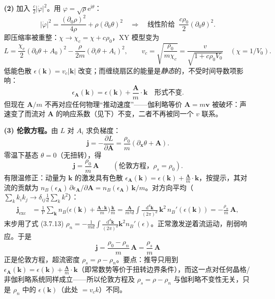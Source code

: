 \textbf{(2)} 加入 $\frac{c}{2}|\dot\varphi|^{2}$。用 $\varphi=\sqrt{\rho}\mathrm{e}^{\mathrm{i}\theta}$：
\begin{equation*}
|\dot\varphi|^{2}=\frac{(\partial_0\rho)^{2}}{4\rho}+\rho(\partial_0\theta)^{2}
\quad\Longrightarrow\quad
\text{线性阶给 }\ \frac{c\rho_0}{2}(\partial_0\theta)^{2} .
\end{equation*}
即压缩率被重整：$\chi\to\chi_c=\chi+c\rho_0$，XY 模型变为
\begin{equation*}
L=\frac{\chi_c}{2}(\partial_0\theta+A_0)^{2}-\frac{\rho}{2m}(\partial_i\theta+A_i)^{2},
\qquad
v_c=\sqrt{\frac{\rho_0}{m\chi_c}}=\frac{v}{\sqrt{1+c\rho_0V_0}}\quad(\chi=1/V_0) .
\end{equation*}
低能色散 $\epsilon(\pmb{k})=v_c|\pmb{k}|$ 改变；而缠绕扇区的能量是\emph{静态}的，不受时间导数项影响：
\begin{equation*}
\epsilon_{\pmb{A}}(\pmb{k})=\epsilon(\pmb{k})+\frac{\pmb{A}}{m}\cdot\pmb{k}
\quad\text{形式不变} .
\end{equation*}
但现在 $\pmb{A}/m$ 不再对应任何物理“推动速度”——伽利略等价 $\pmb{A}=m\pmb{v}$ 被破坏：声速变了而流对 $\pmb{A}$ 的响应系数（见下）不变，二者不再被同一个 $v$ 联系。

\textbf{(3) 伦敦方程。}由 $L$ 对 $A_i$ 求负梯度：
\begin{equation*}
\pmb{j}=-\frac{\partial L}{\partial\pmb{A}}=\frac{\rho_0}{m}(\partial_{\pmb{x}}\theta+\pmb{A}) .
\end{equation*}
零温下基态 $\theta=0$（无扭转），得
\begin{equation*}
\pmb{j}=\frac{\rho_0}{m}\,\pmb{A}
\qquad(\text{伦敦方程，}\rho_s=\rho_0).
\end{equation*}
有限温修正：动量为 $\pmb{k}$ 的激发具有色散 $\epsilon_{\pmb{A}}(\pmb{k})=\epsilon(\pmb{k})+\frac{\pmb{A}}{m}\cdot\pmb{k}$，按提示，其对流的贡献为 $n_B(\epsilon_{\pmb{A}})\,\partial\epsilon_{\pmb{A}}/\partial\pmb{A}=n_B(\epsilon_{\pmb{A}})\,\pmb{k}/m$。对方向平均（$\sum_kk_ik_j\to\delta_{ij}\frac1d\sum_kk^{2}$）：
\begin{align*}
\pmb{j}_{\mathrm{exc}}
&=\frac{1}{\mathcal{V}}\sum_{\pmb{k}}n_B\Big(\epsilon(\pmb{k})+\frac{\pmb{A}\cdot\pmb{k}}{m}\Big)\frac{\pmb{k}}{m}
=\frac{\pmb{A}}{m^{2}d}\int\frac{\mathrm{d}^{d}\pmb{k}}{(2\pi)^{d}}\,
\pmb{k}^{2}\,n_B'(\epsilon(\pmb{k}))
=-\frac{\rho_n}{m}\,\pmb{A} ,
\end{align*}
末步用了式 (3.7.13) $\rho_n=-\frac{1}{md}\int\frac{\mathrm{d}^d\pmb{k}}{(2\pi)^d}\pmb{k}^{2}n_B'(\epsilon)$。正常激发逆着流运动，削弱响应。于是
\begin{equation*}
\boxed{\;\pmb{j}=\frac{\rho_0-\rho_n}{m}\,\pmb{A}
=\frac{\rho_s}{m}\,\pmb{A}\;}
\end{equation*}
正是伦敦方程，超流密度 $\rho_s=\rho-\rho_n$。要点：推导只用到 $\epsilon_{\pmb{A}}(\pmb{k})=\epsilon(\pmb{k})+\frac{\pmb{A}}{m}\cdot\pmb{k}$（即常数势等价于扭转边界条件），而这一点对任何晶格/非伽利略系统同样成立——所以伦敦方程及 $\rho_s=\rho-\rho_n$ 与伽利略不变性无关，只是 $\rho_n$ 中的 $\epsilon(\pmb{k})$（此处 $=v_c k$）不同。

